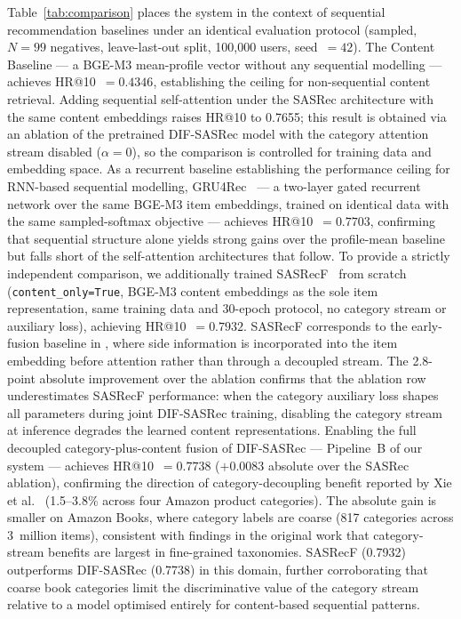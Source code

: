 Table~\ref{tab:comparison} places the system in the context of sequential recommendation
baselines under an identical evaluation protocol (sampled, $N{=}99$ negatives, leave-last-out
split, 100{,}000 users, seed~$=42$).
The Content Baseline --- a BGE-M3 mean-profile vector without any sequential modelling ---
achieves HR@10~$=0.4346$, establishing the ceiling for non-sequential content retrieval.
Adding sequential self-attention under the SASRec architecture \cite{kang2018self} with the
same content embeddings raises HR@10 to 0.7655; this result is obtained via an ablation of
the pretrained DIF-SASRec model with the category attention stream disabled ($\alpha{=}0$),
so the comparison is controlled for training data and embedding space.
As a recurrent baseline establishing the performance ceiling for RNN-based sequential modelling,
GRU4Rec~\cite{hidasi2016gru4rec} --- a two-layer gated recurrent network over the same BGE-M3
item embeddings, trained on identical data with the same sampled-softmax objective ---
achieves HR@10~$=0.7703$, confirming that sequential structure alone yields strong gains over
the profile-mean baseline but falls short of the self-attention architectures that follow.
To provide a strictly independent comparison, we additionally trained SASRecF~\cite{kang2018self}
from scratch (\texttt{content\_only=True}, BGE-M3 content embeddings as the sole item
representation, same training data and 30-epoch protocol, no category stream or auxiliary loss),
achieving HR@10~$=0.7932$.
SASRecF corresponds to the early-fusion baseline in \citet{xie2022difsasrec}, where side
information is incorporated into the item embedding before attention rather than through
a decoupled stream.
The 2.8-point absolute improvement over the ablation confirms that the ablation row
underestimates SASRecF performance: when the category auxiliary loss shapes all parameters
during joint DIF-SASRec training, disabling the category stream at inference degrades
the learned content representations.
Enabling the full decoupled category-plus-content fusion of DIF-SASRec \cite{xie2022difsasrec}
--- Pipeline~B of our system --- achieves HR@10~$=0.7738$ ($+$0.0083 absolute over the
SASRec ablation), confirming the direction of category-decoupling benefit reported by
Xie et al.~\cite{xie2022difsasrec} (1.5--3.8\% across four Amazon product categories).
The absolute gain is smaller on Amazon Books, where category labels are coarse
(817 categories across 3~million items), consistent with findings in the original work
that category-stream benefits are largest in fine-grained taxonomies.
SASRecF (0.7932) outperforms DIF-SASRec (0.7738) in this domain, further corroborating
that coarse book categories limit the discriminative value of the category stream relative
to a model optimised entirely for content-based sequential patterns.

